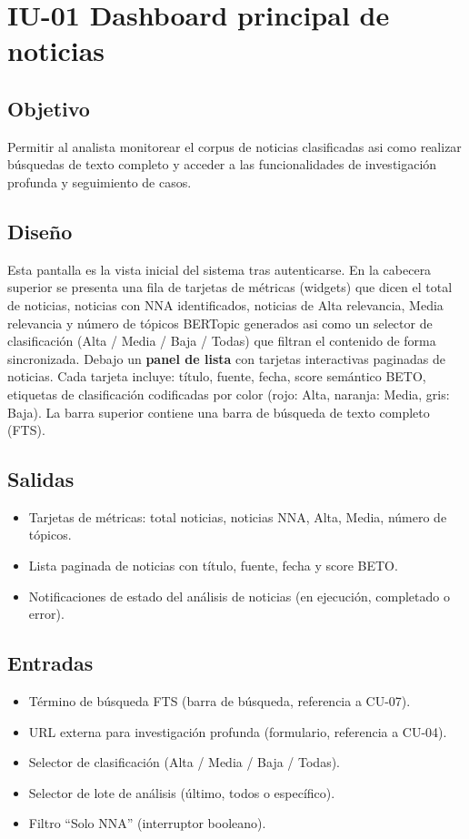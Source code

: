 \section{IU-01 Dashboard principal de noticias}

\subsection{Objetivo}
	Permitir al analista monitorear el corpus de noticias clasificadas asi como realizar búsquedas de
	texto completo y acceder a las funcionalidades de investigación profunda y seguimiento de casos.

\subsection{Diseño}
	Esta pantalla es la vista inicial del sistema tras autenticarse. En la cabecera superior se
	presenta una fila de tarjetas de métricas (widgets) que dicen el total de noticias, noticias con
	NNA identificados, noticias de Alta relevancia, Media relevancia y número de tópicos BERTopic
	generados asi como un  selector de clasificación (Alta / Media / Baja / Todas) que filtran el
	contenido de forma sincronizada.
	Debajo un \textbf{panel de lista} con tarjetas interactivas
	paginadas de noticias. Cada tarjeta incluye: título, fuente, fecha, score semántico BETO,
	etiquetas de clasificación codificadas por color (rojo: Alta, naranja: Media, gris: Baja).
	La barra superior contiene una barra de búsqueda de texto completo (FTS).


\subsection{Salidas}
	\begin{itemize}
		\item Tarjetas de métricas: total noticias, noticias NNA, Alta, Media, número de tópicos.
		\item Lista paginada de noticias con título, fuente, fecha y score BETO.
		\item Notificaciones de estado del análisis de noticias (en ejecución, completado o error).
	\end{itemize}

\subsection{Entradas}
	\begin{itemize}
		\item Término de búsqueda FTS (barra de búsqueda, referencia a CU-07).
		\item URL externa para investigación profunda (formulario, referencia a CU-04).
		\item Selector de clasificación (Alta / Media / Baja / Todas).
		\item Selector de lote de análisis (último, todos o específico).
		\item Filtro ``Solo NNA'' (interruptor booleano).
	\end{itemize}

